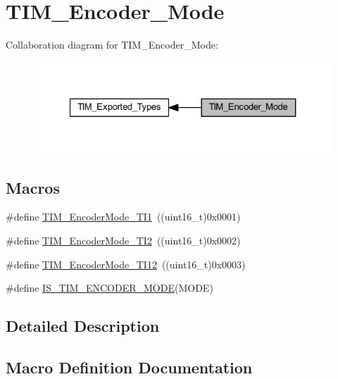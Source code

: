 \hypertarget{group___t_i_m___encoder___mode}{}\section{T\+I\+M\+\_\+\+Encoder\+\_\+\+Mode}
\label{group___t_i_m___encoder___mode}
Collaboration diagram for T\+I\+M\+\_\+\+Encoder\+\_\+\+Mode\+:
\nopagebreak
\begin{figure}[H]
\begin{center}
\leavevmode
\includegraphics[width=327pt]{group___t_i_m___encoder___mode}
\end{center}
\end{figure}
\subsection*{Macros}
\begin{DoxyCompactItemize}
\item 
\#define \hyperlink{group___t_i_m___encoder___mode_gabc63e3617a938382f87439ec58768b8e}{T\+I\+M\+\_\+\+Encoder\+Mode\+\_\+\+T\+I1}~((uint16\+\_\+t)0x0001)
\item 
\#define \hyperlink{group___t_i_m___encoder___mode_ga5627a2d5d47b7301c7dbb29d20ae00e3}{T\+I\+M\+\_\+\+Encoder\+Mode\+\_\+\+T\+I2}~((uint16\+\_\+t)0x0002)
\item 
\#define \hyperlink{group___t_i_m___encoder___mode_ga12511f903de08f1a634ff7828757f081}{T\+I\+M\+\_\+\+Encoder\+Mode\+\_\+\+T\+I12}~((uint16\+\_\+t)0x0003)
\item 
\#define \hyperlink{group___t_i_m___encoder___mode_ga9dd5baa6b2a44e0f25068a650cbfdd1b}{I\+S\+\_\+\+T\+I\+M\+\_\+\+E\+N\+C\+O\+D\+E\+R\+\_\+\+M\+O\+DE}(M\+O\+DE)
\end{DoxyCompactItemize}


\subsection{Detailed Description}


\subsection{Macro Definition Documentation}
\mbox{\label{group___t_i_m___encoder___mode_ga9dd5baa6b2a44e0f25068a650cbfdd1b}} 
